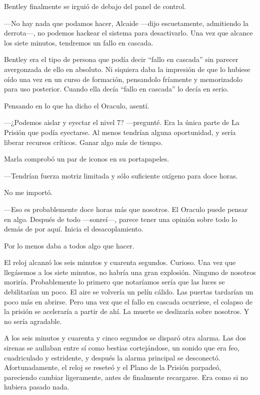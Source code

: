 Bentley finalmente se irguió de debajo del panel de control.

---No hay nada que podamos hacer, Alcaide ---dijo escuetamente,
admitiendo la derrota---, no podemos hackear el sistema para
desactivarlo. Una vez que alcance los siete minutos, tendremos un fallo
en cascada.

Bentley era el tipo de persona que podía decir ``fallo en cascada'' sin
parecer avergonzada de ello en absoluto. Ni siquiera daba la impresión
de que lo hubiese oído una vez en un curso de formación, pensandolo
fríamente y memorizadolo para uso posterior. Cuando ella decía ``fallo
en cascada'' lo decía en serio.

Pensando en lo que ha dicho el Oraculo, asentí.

---¿Podemos aislar y eyectar el nivel 7? ---pregunté. Era la única parte
de La Prisión que podía eyectarse. Al menos tendrían alguna oportunidad,
y sería liberar recursos críticos. Ganar algo más de tiempo.

Marla comprobó un par de iconos en su portapapeles.

---Tendrían fuerza motriz limitada y sólo suficiente oxígeno para doce
horas.

No me importó.

---Eso es probablemente doce horas más que nosotros. El Oraculo puede
pensar en algo. Después de todo ---sonreí---, parece tener una opinión
sobre todo lo demás de por aquí. Inicia el desacoplamiento.

Por lo menos daba a todos algo que hacer.

El reloj alcanzó los seis minutos y cuarenta segundos. Curioso. Una vez
que llegásemos a los siete minutos, no habría una gran explosión.
Ninguno de nosotros moriría. Probablemente lo primero que notaríamos
sería que las luces se debilitarían un poco. El aire se volvería un
pelín cálido. Las puertas tardarían un poco más en abrirse. Pero una vez
que el fallo en cascada ocurriese, el colapso de la prisión se
aceleraría a partir de ahí. La muerte se deslizaría sobre nosotros. Y no
sería agradable.

A los seis minutos y cuarenta y cinco segundos se disparó otra alarma.
Las dos sirenas se aullaban entre sí como bestias cortejándose, un
sonido que era feo, cuadriculado y estridente, y después la alarma
principal se desconectó. Afortunadamente, el reloj se reseteó y el Plano
de la Prisión parpadeó, pareciendo cambiar ligeramente, antes de
finalmente recargarse. Era como si no hubiera pasado nada.

